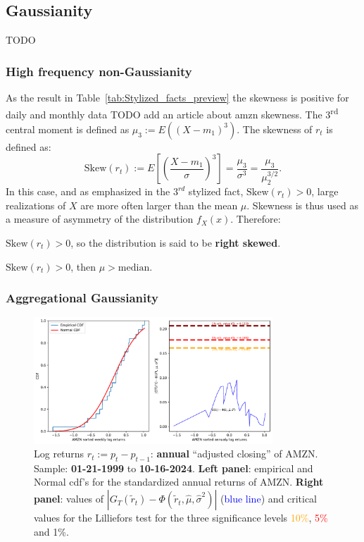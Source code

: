 \documentclass{article}
\begin{document}
\subsection{Gaussianity}
TODO


\subsubsection{High frequency non-Gaussianity}

\noindent As the result in Table~\ref{tab:Stylized_facts_preview} 
the skewness is positive for daily and monthly data \cite{Skewness} TODO add an article about amzn skewness.
The 3\textsuperscript{rd} central moment is defined as
$\mu_3 := E((X - m_1)^3).$ The skewness of \( r_t \) is defined as:
\[
\text{Skew}(r_t) := E \left[ \left( \frac{X - m_1}{\sigma} \right)^3 \right] = \frac{\mu_3}{\sigma^3} = \frac{\mu_3}{\mu_2^{3/2}}.
\]
In this case, and as emphasized in the $3^{rd}$ stylized fact, \( \text{Skew}(r_t) >0 \), large realizations of \( X \) are more often larger
than the mean \( \mu \). 
Skewness is thus used as a measure of asymmetry of the distribution \( f_X(x) \). Therefore:
 
\( \text{Skew}(r_t) > 0 \), so the distribution is said to be \textbf{right skewed}. 

\( \text{Skew}(r_t) > 0 \), then \( \mu > \text{median} \).

\subsubsection{Aggregational Gaussianity}
\begin{figure}[H]
    \centering
    \includegraphics[width=0.8\textwidth]{Img/lillie_test_AMZNannualy.pdf}
    \caption{Log returns $r_t := p_t - p_{t-1}$: \textbf{annual} “adjusted closing” of AMZN. 
    Sample: \textbf{01-21-1999} to \textbf{10-16-2024}. \textbf{Left panel}: empirical and Normal cdf's for the standardized annual returns of AMZN. \textbf{Right panel}: values of $\left| G_T(\tilde{r}_t) - \Phi(\tilde{r}_t, \hat{\mu}, \hat{\sigma}^2) \right|$ (\textcolor{blue}{blue line}) and critical values for the Lilliefors test for the three significance levels \textcolor{orange}{10\%}, \textcolor{red}{5\%} and \textcolor{darkbrown}{1\%}.}
    \label{fig:Lillie_test_weekly}
\end{figure}
\end{document}
